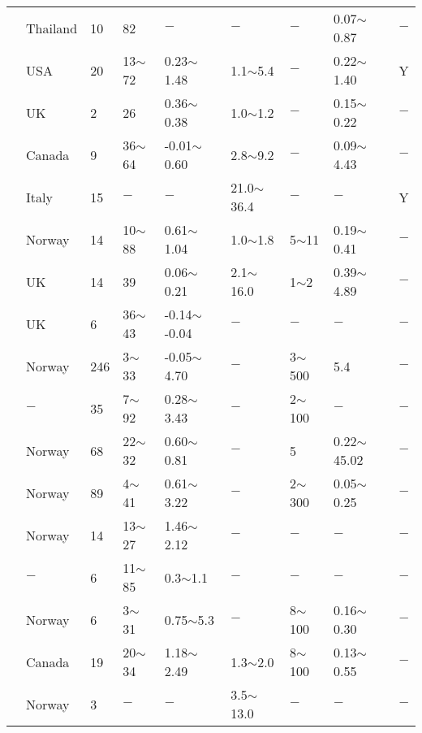 {\begin{longtable}{lllllllll}
    \citet{Balasubramaniam1976390} & Thailand & 10    & 82    & $-$     & $-$     & $-$     & 0.07$\sim$0.87 & $-$ \\
    \citet{Baligh1980447} & USA   & 20    & 13$\sim$72 & 0.23$\sim$1.48 & 1.1$\sim$5.4 & $-$     & 0.22$\sim$1.40 & Y \\
    \citet{Banerjee197835} & UK    & 2     & 26    & 0.36$\sim$0.38 & 1.0$\sim$1.2 & $-$     & 0.15$\sim$0.22 & $-$ \\
    \citet{Baracos1980559} & Canada & 9     & 36$\sim$64 & -0.01$\sim$0.60 & 2.8$\sim$9.2 & $-$     & 0.09$\sim$4.43 & $-$ \\
    \citet{Battaglio1986129} & Italy & 15    & $-$     & $-$     & 21.0$\sim$36.4 & $-$     & $-$     & Y \\
    \citet{Berre197339} & Norway & 14    & 10$\sim$88 & 0.61$\sim$1.04 & 1.0$\sim$1.8 & 5$\sim$11  & 0.19$\sim$0.41 & $-$ \\
    \citet{Bishop19713} & UK    & 14    & 39    & 0.06$\sim$0.21 & 2.1$\sim$16.0 & 1$\sim$2   & 0.39$\sim$4.89 & $-$ \\
    \citet{Bishop19651} & UK    & 6     & 36$\sim$43 & -0.14$\sim$-0.04 & $-$     & $-$     & $-$     & $-$ \\
    \citet{Bjerrum195449} & Norway & 246   & 3$\sim$33  & -0.05$\sim$4.70 & $-$     & 3$\sim$500 & 5.4   & $-$ \\
    \citet{Bjerrum1960711} & $-$     & 35    & 7$\sim$92  & 0.28$\sim$3.43 & $-$     & 2$\sim$100 & $-$     & $-$ \\
    \citet{Bjerrum1963147} & Norway & 68    & 22$\sim$32 & 0.60$\sim$0.81 & $-$     & 5     & 0.22$\sim$45.02 & $-$ \\
    \citet{Bjerrum196783} & Norway & 89    & 4$\sim$41  & 0.61$\sim$3.22 & $-$     & 2$\sim$300 & 0.05$\sim$0.25 & $-$ \\
    \citet{Bjerrum1969377} & Norway & 14    & 13$\sim$27 & 1.46$\sim$2.12 & $-$     & $-$     & $-$     & $-$ \\
    \citet{Bjerrum19721} & $-$     & 6     & 11$\sim$85 & 0.3$\sim$1.1 & $-$     & $-$     & $-$     & $-$ \\
    \citet{Bjerrum1973111} & Norway & 6     & 3$\sim$31  & 0.75$\sim$5.3 & $-$     & 8$\sim$100 & 0.16$\sim$0.30 & $-$ \\
    \citet{Bozozuk1972299} & Canada & 19    & 20$\sim$34 & 1.18$\sim$2.49 & 1.3$\sim$2.0 & 8$\sim$100 & 0.13$\sim$0.55 & $-$ \\
    \citet{Broms19631} & Norway & 3     & $-$     & $-$     & 3.5$\sim$13.0 & $-$     & $-$     & $-$ \\

\end{longtable}}

